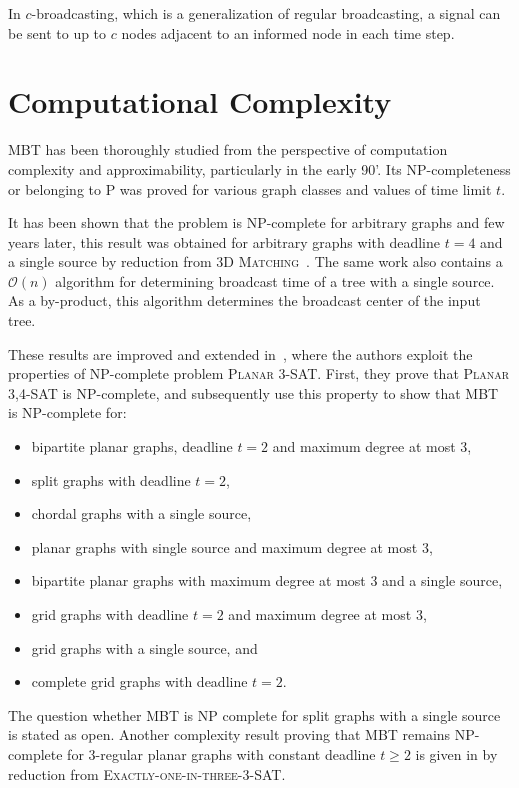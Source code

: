 In $c$-broadcasting, which is a generalization of regular broadcasting, a signal can be sent to up to $c$ nodes adjacent to an informed node in each time step.


\section{Computational Complexity}

MBT has been thoroughly studied from the perspective of computation complexity and approximability, particularly in the early 90'.
Its NP-completeness or belonging to P was proved for various graph classes and values of time limit $t$.

It has been shown that the problem is NP-complete for arbitrary graphs \cite{garey79} and few years later, 
this result was obtained for arbitrary graphs with deadline $t=4$ and a single source by reduction from \textsc{3D Matching}~\cite{slater81}. 
The same work also contains a $\mathcal{O}(n)$ algorithm for determining broadcast time of a tree with a single source. 
As a by-product, this algorithm determines the broadcast center of the input tree.

These results are improved and extended in~\cite{jansen95}, where the authors exploit the properties of NP-complete problem \textsc{Planar 3-SAT}.
First, they prove that \textsc{Planar 3,4-SAT} is NP-complete, and subsequently use this property to show that MBT is NP-complete for:
\begin{itemize}
\item bipartite planar graphs, deadline $t=2$ and maximum degree at most 3,
\item split graphs with deadline $t=2$,
\item chordal graphs with a single source, 
\item planar graphs with single source and maximum degree at most 3, 
\item bipartite planar graphs with maximum degree at most 3 and a single source,
\item grid graphs with deadline $t=2$ and maximum degree at most 3,
\item grid graphs with a single source, and
\item complete grid graphs with deadline $t=2$. 
\end{itemize}
The question whether MBT is NP complete for split graphs with a single source is stated as open.
Another complexity result proving that MBT remains NP-complete for 3-regular planar graphs with constant deadline $t\geq 2$ 
is given in \cite{middendorf93} by reduction from \textsc{Exactly-one-in-three-3-SAT}.


